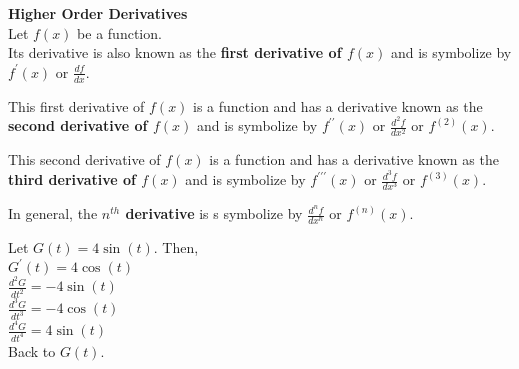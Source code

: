\documentclass{ximera}
\begin{document}
\begin{definition} \textbf{\textcolor{green!50!black}{Higher Order Derivatives}} \\


Let $f(x)$ be a function. \\


Its derivative is also known as the \textbf{first derivative of $f(x)$} and is symbolize by \textbf{$f^{\prime}(x)$} or \textbf{$\frac{df}{dx}$}.

This first derivative of $f(x)$ is a function and has a derivative known as the \textbf{second derivative of $f(x)$} and is symbolize by \textbf{$f^{\prime\prime}(x)$} or \textbf{$\frac{d^2f}{dx^2}$} or \textbf{$f^{(2)}(x)$}.


This second derivative of $f(x)$ is a function and has a derivative known as the \textbf{third derivative of $f(x)$} and is symbolize by \textbf{$f^{\prime\prime\prime}(x)$} or \textbf{$\frac{d^3f}{dx^3}$} or \textbf{$f^{(3)}(x)$}.


In general, the \textbf{$n^{th}$ derivative} is s symbolize by \textbf{$\frac{d^{n}f}{dx^n}$} or \textbf{$f^{(n)}(x)$}.


\end{definition}




\begin{example}


Let $G(t) = 4 \sin(t)$. Then,\\

$G^{\prime}(t) = 4 \cos(t)$ \\

$\frac{d^{2}G}{dt^{2}} = -4 \sin(t)$ \\

$\frac{d^{3}G}{dt^{3}} = -4 \cos(t)$ \\

$\frac{d^{4}G}{dt^{4}} = 4 \sin(t)$ \\

Back to $G(t)$.

\end{example}
\end{document}
